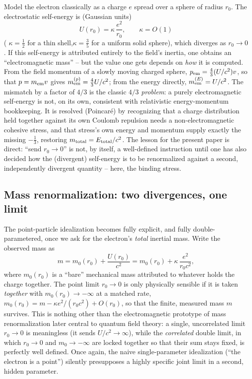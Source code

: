 Model the electron classically as a charge $e$ spread over a
sphere of radius $r_0$. The electrostatic self-energy is
(Gaussian units)
\begin{equation}
U(r_0) = \kappa\,\frac{e^2}{r_0}, \qquad \kappa = O(1)
\end{equation}
( $\kappa=\tfrac12$ for a thin shell,$\kappa=\tfrac35$ for a uniform solid sphere),
which diverges as $r_0\to0$. If this self-energy is attributed
entirely to the field's inertia, one obtains an
``electromagnetic mass'' -- but the value one gets depends on
\emph{how} it is computed. From the field momentum of a slowly
moving charged sphere, $p_{\rm em}=\tfrac{4}{3}(U/c^2)v$, so
that $p=m_{\rm em}v$ gives 
$m_{\rm em}^{(p)}=\tfrac{4}{3}U/c^2$;
from the energy directly, $m_{\rm em}^{(E)}=U/c^2$. The mismatch
by a factor of $4/3$ is the classic \emph{$4/3$ problem}: a
purely electromagnetic self-energy is not, on its own,
consistent with relativistic energy-momentum bookkeeping. It is
resolved (Poincar\'e) by recognizing that a charge distribution
held together against its own Coulomb repulsion needs a
non-electromagnetic cohesive stress, and that stress's own
energy and momentum supply exactly the missing $-\tfrac13$,
restoring $m_{\rm total}=E_{\rm total}/c^2$. The lesson for the
present paper is direct: ``send $r_0\to0$'' is not, by itself, a
well-defined instruction until one has also decided how the
(divergent) self-energy is to be renormalized against a second,
independently divergent quantity -- here, the binding stress.

\subsection{Mass renormalization: two divergences, one limit}

The point-particle idealization becomes fully explicit, and fully
double-parametered, once we ask for the electron's \emph{total} inertial mass.
Write the observed mass as
\begin{equation}
m = m_0(r_0) + \frac{U(r_0)}{c^2} = m_0(r_0) + \kappa\,\frac{e^2}{r_0 c^2},
\end{equation}
where $m_0(r_0)$ is a ``bare'' mechanical mass attributed to
whatever holds the charge together. The point limit $r_0\to0$ is
only physically sensible if it is taken \emph{together} with
$m_0(r_0)\to-\infty$ at a matched rate, $m_0(r_0) = m - \kappa
e^2/(r_0c^2) + O(r_0)$, so that the finite, measured mass $m$
survives. This is nothing other than the electromagnetic
prototype of mass renormalization later central to quantum field
theory: a single, uncorrelated limit $r_0\to0$ is meaningless
(it sends $U/c^2\to\infty$), while the \emph{correlated} double
limit, in which $r_0\to0$ and $m_0\to-\infty$ are locked
together so that their sum stays fixed, is perfectly well
defined. Once again, the naive single-parameter idealization
(``the electron is a point'') silently presupposes a highly
specific joint limit in a second, hidden parameter.

